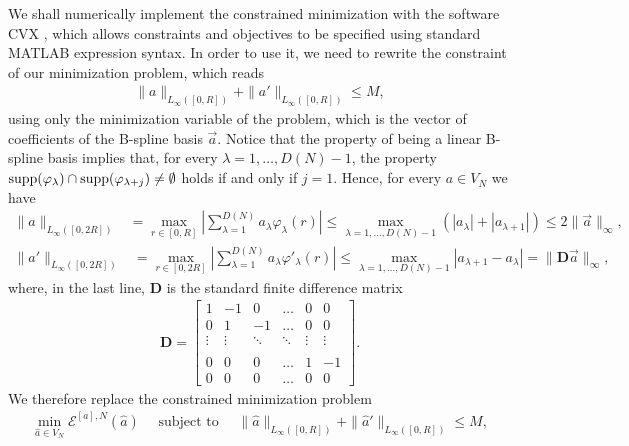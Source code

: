 We shall numerically implement the constrained minimization with the software CVX \cite{cvx,gb08}, which allows constraints and objectives to be specified using standard MATLAB expression syntax. In order to use it, we need to rewrite the constraint of our minimization problem, which reads
\begin{align*}
	\|a\|_{L_{\infty}([0,R])} + \|a'\|_{L_{\infty}([0,R])} \leq M,
\end{align*}
using only the minimization variable of the problem, which is the vector of coefficients of the B-spline basis $\vec{a}$. Notice that the property of being a linear B-spline basis implies that, for every $\lambda = 1, \ldots, D(N)-1$, the property $\operatorname{supp}(\varphi_{\lambda}) \cap \operatorname{supp}(\varphi_{\lambda + j}) \not= \emptyset$ holds if and only if $j = 1$. Hence, for every $a \in V_N$ we have
\begin{align*}
\|a\|_{L_{\infty}([0,2 R])} &= \max_{r \in [0,R]} \left|\sum^{D(N)}_{\lambda = 1} a_{\lambda} \varphi_{\lambda}(r)\right|
 \leq \max_{\lambda = 1, \ldots, D(N)-1} \left(|a_{\lambda}| + |a_{\lambda+1}|\right) 
 \leq 2 \|\vec{a}\|_{\infty},
\end{align*}
\begin{align*}
\|a'\|_{L_{\infty}([0,2 R])} &= \max_{r \in [0,2 R]} \left|\sum^{D(N)}_{\lambda = 1} a_{\lambda} \varphi'_{\lambda}(r)\right| 
 \leq \max_{\lambda = 1, \ldots, D(N)-1} |a_{\lambda+1} - a_{\lambda}|
 = \|\mathbf D\vec{a}\|_{\infty},
\end{align*}
where, in the last line, $\mathbf  D$ is the standard finite difference matrix
\begin{align*}
\mathbf  D = \begin{bmatrix}
    1       & -1 & 0 & \dots & 0 & 0 \\
    0     & 1 & -1 & \dots & 0 & 0 \\
   \vdots & \vdots & \ddots & \ddots & \vdots & \vdots \\ \\
    0       & 0 & 0 & \dots & 1 & -1 \\
    0       & 0 & 0 & \dots & 0 & 0
\end{bmatrix}.
\end{align*}
We therefore replace the constrained minimization problem
\begin{align*}
\min_{\widehat{a} \in V_N} \mathcal{E}^{[a],N}(\widehat{a}) \quad \text{ subject to } \quad \|\widehat{a}\|_{L_{\infty}([0,R])} + \|\widehat{a}'\|_{L_{\infty}([0,R])} \leq M,
\end{align*}
